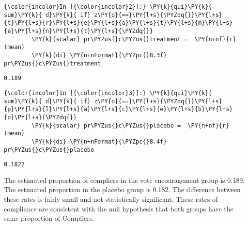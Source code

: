 \documentclass[11pt,notitlepage]{article}\usepackage[]{graphicx}\usepackage[]{color}
\makeatletter
\newenvironment{kframe}{%
 \def\at@end@of@kframe{}%
 \ifinner\ifhmode%
  \def\at@end@of@kframe{\end{minipage}}%
  \begin{minipage}{\columnwidth}%
 \fi\fi%
 \def\FrameCommand##1{\hskip\@totalleftmargin \hskip-\fboxsep
 \colorbox{shadecolor}{##1}\hskip-\fboxsep
     \hskip-\linewidth \hskip-\@totalleftmargin \hskip\columnwidth}%
 \MakeFramed {\advance\hsize-\width
   \@totalleftmargin\z@ \linewidth\hsize
   \@setminipage}}%
 {\par\unskip\endMakeFramed%
 \at@end@of@kframe}
\newenvironment{knitrout}{}{} %
\makeatother
\begin{document}
\begin{enumerate}[a)]
\begin{knitrout}
\begin{kframe}
    \begin{Verbatim}[commandchars=\\\{\}]
{\color{incolor}In [{\color{incolor}2}]:} \PY{k}{qui}\PY{k}{ sum}\PY{k}{ d}\PY{k}{ if} z\PY{o}{==}\PY{l+s}{\PYZdq{}}\PY{l+s}{t}\PY{l+s}{r}\PY{l+s}{e}\PY{l+s}{a}\PY{l+s}{t}\PY{l+s}{m}\PY{l+s}{e}\PY{l+s}{n}\PY{l+s}{t}\PY{l+s}{\PYZdq{}}
        \PY{k}{scalar} pr\PYZus{}c\PYZus{}treatment =  \PY{n+nf}{r}(mean)
        \PY{k}{di} \PY{n+nFormat}{\PYZpc{}8.3f} pr\PYZus{}c\PYZus{}treatment
\end{Verbatim}

    \begin{Verbatim}[commandchars=\\\{\}]
   0.189
    \end{Verbatim}

    \begin{Verbatim}[commandchars=\\\{\}]
{\color{incolor}In [{\color{incolor}3}]:} \PY{k}{qui}\PY{k}{ sum}\PY{k}{ d}\PY{k}{ if} z\PY{o}{==}\PY{l+s}{\PYZdq{}}\PY{l+s}{p}\PY{l+s}{l}\PY{l+s}{a}\PY{l+s}{c}\PY{l+s}{e}\PY{l+s}{b}\PY{l+s}{o}\PY{l+s}{\PYZdq{}}
        \PY{k}{scalar} pr\PYZus{}c\PYZus{}placebo =  \PY{n+nf}{r}(mean)
        \PY{k}{di} \PY{n+nFormat}{\PYZpc{}8.4f} pr\PYZus{}c\PYZus{}placebo
\end{Verbatim}

    \begin{Verbatim}[commandchars=\\\{\}]
  0.1822
    \end{Verbatim}
\end{kframe}
\end{knitrout}

The estimated proportion of compliers in the vote encouragement group is 0.189. The estimated proportion in the placebo group is 0.182. The difference between these rates is fairly small and not statistically significant. These rates of compliance are consistent with the null hypothesis that both groups have the same proportion of Compliers.


\end{enumerate}
\end{document}
